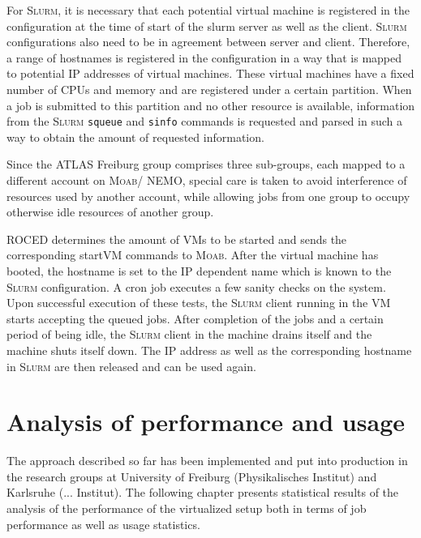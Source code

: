 For \textsc{Slurm}, it is necessary that each potential virtual
machine is registered in the configuration at the time of start of the
slurm server as well as the client. \textsc{Slurm} configurations also
need to be in agreement between server and client.
Therefore, a range of hostnames is registered in the configuration in
a way that is mapped to potential IP addresses of virtual machines.
These virtual machines have a fixed number of CPUs and memory and are
registered under a certain partition.
When a job is submitted to this partition and no other resource is
available, information from the \textsc{Slurm} \texttt{squeue} and
\texttt{sinfo} commands is requested and parsed in such a way to
obtain the amount of requested information.

Since the ATLAS Freiburg group comprises three sub-groups, each mapped
to a different account on \textsc{Moab}/ NEMO, special care is taken to
avoid interference of resources used by another account, while
allowing jobs from one group to occupy otherwise idle resources of another group.


ROCED determines the amount of VMs to be started and sends the
corresponding startVM commands to \textsc{Moab}.
After the virtual machine has booted, the hostname is set to the IP
dependent name which is known to the \textsc{Slurm} configuration.
A cron job executes a few sanity
checks on the system.
Upon successful execution of these tests, the \textsc{Slurm} client
running in the VM starts accepting the queued jobs.
After completion of the jobs and a certain period of being idle, the
\textsc{Slurm} client in the machine drains itself and the machine
shuts itself down.
The IP address as well as the corresponding hostname in \textsc{Slurm}
are then released and can be used again.


\section{Analysis of performance and usage}

The approach described so far has been implemented and put into
production in the research groups at University of Freiburg
(Physikalisches Institut) and Karlsruhe (... Institut).
The following chapter presents statistical results of the analysis of
the performance of the virtualized setup both in terms of job
performance as well as usage statistics.


